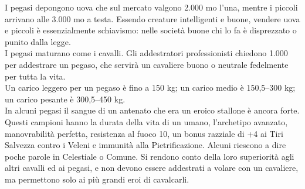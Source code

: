 \begin{multicols}{2}
I pegasi depongono uova che sul mercato valgono 2.000 mo l'una, mentre i piccoli arrivano alle 3.000 mo a testa. Essendo creature intelligenti e buone, vendere uova e piccoli è essenzialmente schiavismo: nelle società buone chi lo fa è disprezzato o punito dalla legge.\\

I pegasi maturano come i cavalli. Gli addestratori professionisti chiedono 1.000 per addestrare un pegaso, che servirà un cavaliere buono o neutrale fedelmente per tutta la vita.\\

Un carico leggero per un pegaso è fino a 150 kg; un carico medio è 150,5–300 kg; un carico pesante è 300,5–450 kg.\\

In alcuni pegasi il sangue di un antenato che era un eroico stallone è ancora forte. Questi campioni hanno la durata della vita di un umano, l'archetipo avanzato, manovrabilità perfetta, resistenza al fuoco 10, un bonus razziale di +4 ai Tiri Salvezza contro i Veleni e immunità alla Pietrificazione. Alcuni riescono a dire poche parole in Celestiale o Comune. Si rendono conto della loro superiorità agli altri cavalli ed ai pegasi, e non devono essere addestrati a volare con un cavaliere, ma permettono solo ai più grandi eroi di cavalcarli.\\


\end{multicols}
